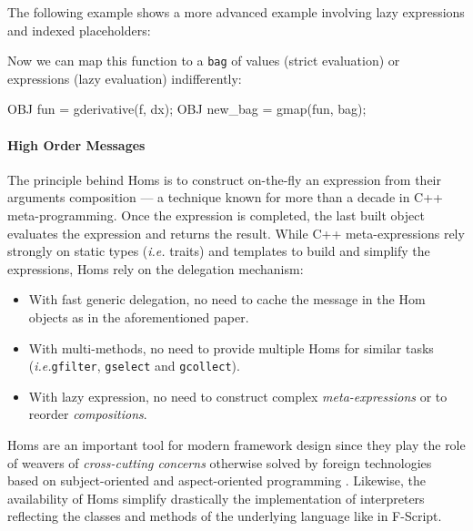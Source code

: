 \documentclass[preprint,10pt]{sigplanconf}
\newcommand{\abbrev}[1]{{\em #1}\xspace}
\newcommand{\ie}{\abbrev{i.e.}}
\newcommand{\acronym}[1]{{\sc #1}\xspace}
\newcommand{\Hom}    {\acronym{Hom}}
\newcommand{\ProgLang}[1]{{\sc #1}\xspace}
\newcommand{\Cpp}       {\ProgLang{C{\small ++}}}
\newcommand{\Fscript}   {\ProgLang{F-Script}}
\newcommand{\code}[1]{\lstinline[language=COS,style=samplecode]|#1|}
\begin{document}
The following example shows a more advanced example involving lazy expressions and indexed placeholders:
\newpage
{}
Now we can map this function to a \code{bag} of values (strict evaluation) or expressions (lazy evaluation) indifferently:
\begin{COS}
OBJ fun = gderivative(f, dx);
OBJ new_bag = gmap(fun, bag);
\end{COS}

\paragraph{High Order Messages}

The principle behind {\Hom}s is to construct on-the-fly an expression from their arguments composition  \cite{weih05} --- a technique known for more than a decade in \Cpp meta-programming. Once the expression is completed, the last built object evaluates the expression and returns the result. While \Cpp meta-expressions rely strongly on static types (\ie traits) and templates to build and simplify the expressions, {\Hom}s rely on the delegation mechanism:
\begin{itemize}
\item With fast generic delegation, no need to cache the message in the \Hom objects as in the aforementioned paper.

\item With multi-methods, no need to provide multiple {\Hom}s for similar tasks (\ie \code{gfilter}, \code{gselect} and \code{gcollect}).

\item With lazy expression, no need to construct complex {\em meta-expressions} or to reorder {\em compositions}.
\end{itemize}
{\Hom}s are an important tool for modern framework design since they play the role of weavers of {\em cross-cutting concerns} otherwise solved by foreign technologies based on subject-oriented \cite{har93} and aspect-oriented programming \cite{kic97}. Likewise, the availability of {\Hom}s simplify drastically the implementation of interpreters reflecting the classes and methods of the underlying language like in \Fscript \cite{mou06}.
\end{document}
